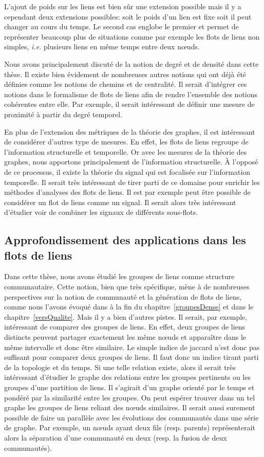 L'ajout de poids sur les liens est bien sûr une extension possible mais il y a cependant deux extensions possibles: soit le poids d'un lien est fixe soit il peut changer au cours du temps.
Le second cas englobe le premier et permet de représenter beaucoup plus de situations comme par exemple les flots de liens non simples, \emph{i.e.} plusieurs liens en même temps entre deux n\oe uds.

Nous avons principalement discuté de la notion de degré et de densité dans cette thèse.
Il existe bien évidement de nombreuses autres notions qui ont déjà été définies comme les notions de chemins et de centralité.
Il serait d'intégrer ces notions dans le formalisme de flots de liens afin de rendre l'ensemble des notions cohérentes entre elle.
Par exemple, il serait intéressant de définir une mesure de proximité à partir du degré temporel.

En plus de l'extension des métriques de la théorie  des graphes, il est intéressant de considérer d'autres type de mesures.
En effet, les flots de liens regroupe de l'information structurelle et temporelle.
Or avec les mesures de la théorie des graphes, nous apportons principalement de l'information structurelle.
\`A l'opposé de ce processus, il existe la théorie du signal qui est focalisée sur l'information temporelle.
Il serait très intéressant de tirer parti de ce domaine pour enrichir les méthodes d'analyses des flots de liens.
Il est par exemple peut être possible de considérer un flot de liens comme un signal.
Il serait alors très intéressant d'étudier voir de combiner les signaux de différents sous-flots.

\subsection{Approfondissement des applications dans les flots de liens}
Dans cette thèse, nous avons étudié les groupes de liens comme structure communautaire.
Cette notion, bien que très spécifique, mène à de nombreuses perspectives sur la notion de communauté et la génération de flots de liens, comme nous l'avons évoqué dans à la fin du chapitre~\ref{groupesDense} et dans le chapitre~\ref{versQualite}.
Mais il y a bien d'autres pistes.
Il serait, par exemple, intéressant de comparer des groupes de liens.
En effet, deux groupes de liens distincts peuvent partager exactement les même n\oe uds et apparaître dans le même intervalle et donc être similaire.
Le simple indice de jaccard n'est donc pas suffisant pour comparer deux groupes de liens.
Il faut donc un indice tirant parti de la topologie et du temps.
Si une telle relation existe, alors il serait très intéressant d'étudier le graphe des relations entre les groupes pertinents ou les groupes d'une partition de liens.
Il s'agirait d'un graphe orienté par le temps et pondéré par la similarité entre les groupes.
On peut espérer trouver dans un tel graphe les groupes de liens reliant des n\oe uds similaires.
Il serait aussi surement possible de faire un parallèle avec les évolutions des communautés dans une série de graphe.
Par exemple, un n\oe uds ayant deux fils (resp. parents) représenterait alors la séparation d'une communauté en deux (resp. la fusion de deux communautés).

